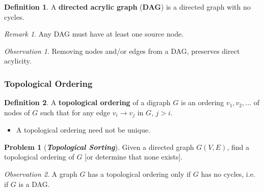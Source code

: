 \documentclass[12pt]{extarticle}
\theoremstyle{definition}
\newtheorem*{definition}{Definition}
\newtheorem*{problem}{Problem}
\theoremstyle{remark}
\newtheorem*{remark}{Remark}
\newtheorem*{observation}{Observation}
\newcommand{\probname}[1]{\noindent \textbf{\textit{#1}}}
\begin{document}
\begin{figure}[h]
    \centering
\end{figure}

\begin{definition}
    A \textbf{directed acrylic graph} (\textbf{DAG}) is a directed graph with no cycles.
\end{definition}
\begin{remark}
    Any DAG must have at least one source node.
\end{remark}
\begin{observation}
    Removing nodes and/or edges from a DAG, preserves direct acylicity.
\end{observation}

\subsubsection*{Topological Ordering}
\begin{definition}
    A \textbf{topological ordering} of a digraph $G$ is an ordering $v_1,v_2,...$ of nodes of $G$ such that for any edge $v_i\to v_j$ in $G$, $j>i$. \begin{itemize} 
        \item A topological ordering need not be unique.
    \end{itemize}
\end{definition}

\begin{problem}[\probname{Topological Sorting}]
    Given a directed graph $G(V, E)$, find a topological ordering of $G$ [or determine that none exists].
\end{problem}

\begin{observation}
    A graph $G$ has a topological ordering only if $G$ has no cycles, i.e. if $G$ is a DAG.
\end{observation}
\end{document}
